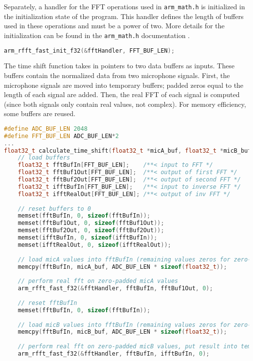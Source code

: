 \documentclass[11pt]{ucthesisCP}
\begin{document}
Separately, a handler for the FFT operations used in \verb|arm_math.h| is initialized in the initialization state of the program. This handler defines the length of buffers used in these operations and must be a power of two. More details for the initialization can be found in the \verb|arm_math.h| documentation \cite{arm}.

\begin{lstlisting}[language=C++]
arm_rfft_fast_init_f32(&fftHandler, FFT_BUF_LEN);
\end{lstlisting}

The time shift function takes in pointers to two data buffers as inputs. These buffers contain the normalized data from two microphone signals. First, the microphone signals are moved into temporary buffers; padded zeros equal to the length of each signal are added. Then, the real FFT of each signal is computed (since both signals only contain real values, not complex). For memory efficiency, some buffers are reused.

\begin{lstlisting}[language=C++]
#define ADC_BUF_LEN 2048
#define FFT_BUF_LEN ADC_BUF_LEN*2
...
float32_t calculate_time_shift(float32_t *micA_buf, float32_t *micB_buf) {
	// load buffers
	float32_t fftBufIn[FFT_BUF_LEN];    /**< input to FFT */
	float32_t fftBuf1Out[FFT_BUF_LEN];  /**< output of first FFT */
	float32_t fftBuf2Out[FFT_BUF_LEN];  /**< output of second FFT */
	float32_t ifftBufIn[FFT_BUF_LEN];   /**< input to inverse FFT */
	float32_t ifftRealOut[FFT_BUF_LEN]; /**< output of inv FFT */
	
	// reset buffers to 0
	memset(fftBufIn, 0, sizeof(fftBufIn));
	memset(fftBuf1Out, 0, sizeof(fftBuf1Out));
	memset(fftBuf2Out, 0, sizeof(fftBuf2Out));
	memset(ifftBufIn, 0, sizeof(ifftBufIn));
	memset(ifftRealOut, 0, sizeof(ifftRealOut));
	
	// load micA values into fftBufIn (remaining values zeros for zero-padding)
	memcpy(fftBufIn, micA_buf, ADC_BUF_LEN * sizeof(float32_t));
	
	// perform real fft on zero-padded micA values
	arm_rfft_fast_f32(&fftHandler, fftBufIn, fftBuf1Out, 0);
	
	// reset fftBufIn
	memset(fftBufIn, 0, sizeof(fftBufIn));
	
	// load micB values into fftBufIn (remaining values zeros for zero-padding)
	memcpy(fftBufIn, micB_buf, ADC_BUF_LEN * sizeof(float32_t));
	
	// perform real fft on zero-padded micB values, put result into temp buf
	arm_rfft_fast_f32(&fftHandler, fftBufIn, ifftBufIn, 0);
\end{lstlisting}
\end{document}
